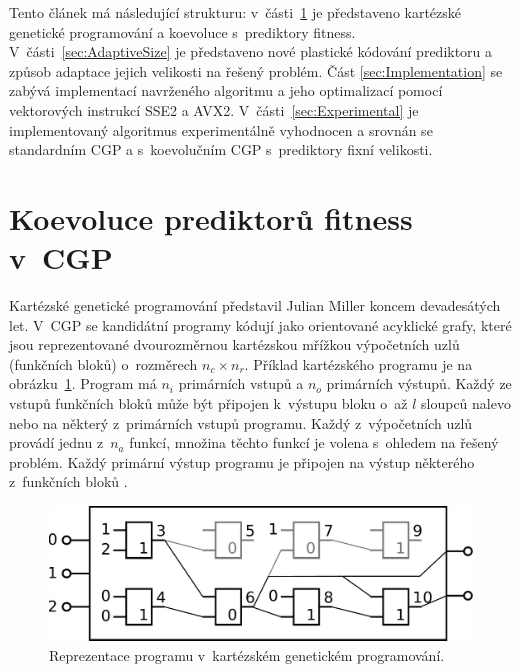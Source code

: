 \documentclass[czech]{ExcelAtFIT} %
\begin{document}
Tento článek má následující strukturu: v~části~\ref{sec:Coevolution} je představeno kartézské genetické programování a koevoluce s~prediktory fitness. V~části~\ref{sec:AdaptiveSize} je představeno nové plastické kódování prediktoru a způsob adaptace jejich velikosti na řešený problém. Část \ref{sec:Implementation} se zabývá implementací navrženého algoritmu a jeho optimalizací pomocí vektorových instrukcí SSE2 a AVX2. V~části~\ref{sec:Experimental} je implementovaný algoritmus experimentálně vyhodnocen a srovnán se standardním CGP a s~koevolučním CGP s~prediktory fixní velikosti.



\section{Koevoluce prediktorů fitness v~CGP}
\label{sec:Coevolution}

Kartézské genetické programování představil Julian Miller koncem devadesátých let. V~CGP se kandidátní programy kódují jako orientované acyklické grafy, které jsou reprezentované dvourozměrnou kartézskou mřížkou výpočetních uzlů (funkčních bloků) o~roz\-mě\-rech $n_c \times n_r$. Příklad kar\-téz\-ského programu je na obrázku~\ref{fig:CgpCircuit}. Program má $n_i$ primárních vstupů a $n_o$ primárních výstupů. Každý ze vstupů funkčních bloků může být připojen k~výstupu bloku o~až $l$ sloupců nalevo nebo na některý z~primárních vstupů programu. Každý z~výpočetních uzlů provádí jednu z~$n_a$ funkcí, množina těchto funkcí je volena s~ohledem na řešený problém. Každý primární výstup programu je připojen na výstup některého z~funkčních bloků \cite{ZelenaCGP}.

\begin{figure}[h]
    \centering
    \includegraphics[width=0.8\linewidth]{images/cgp.pdf}
    \caption{Reprezentace programu v~kartézském genetickém programování.}
    \label{fig:CgpCircuit}
\end{figure}
\end{document}
